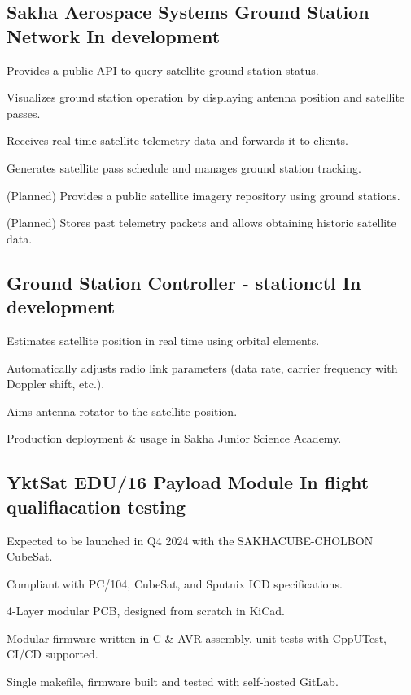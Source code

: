 \documentclass[letter,10pt]{article}
\begin{document}
\subsection{{Sakha Aerospace Systems Ground Station Network \hfill In development}}
\begin{zitemize}
\item Provides a public API to query satellite ground station status.
\item Visualizes ground station operation by displaying antenna position and satellite passes.
\item Receives real-time satellite telemetry data and forwards it to clients.
\item Generates satellite pass schedule and manages ground station tracking.
\item (Planned) Provides a public satellite imagery repository using ground stations.
\item (Planned) Stores past telemetry packets and allows obtaining historic satellite data.
\end{zitemize}

\subsection{{Ground Station Controller - stationctl \hfill In development}}
\begin{zitemize}
\item Estimates satellite position in real time using orbital elements.
\item Automatically adjusts radio link parameters (data rate, carrier frequency with Doppler shift, etc.).
\item Aims antenna rotator to the satellite position.
\item Production deployment \& usage in Sakha Junior Science Academy.
\end{zitemize}

\subsection{{YktSat EDU/16 Payload Module \hfill In flight qualifiacation testing}}
\begin{zitemize}
\item Expected to be launched in Q4 2024 with the SAKHACUBE-CHOLBON CubeSat.
\item Compliant with PC/104, CubeSat, and Sputnix ICD specifications.
\item 4-Layer modular PCB, designed from scratch in KiCad.
\item Modular firmware written in C \& AVR assembly, unit tests with CppUTest, CI/CD supported.
\item Single makefile, firmware built and tested with self-hosted GitLab.
\end{zitemize}
\end{document}
